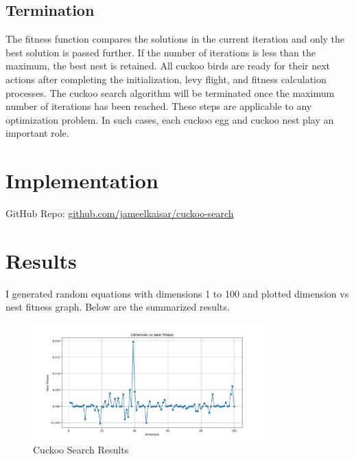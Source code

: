\documentclass{article}
\begin{document}
\subsection*{Termination}
The fitness function compares the solutions in the current iteration and only the best solution is passed further. If the number of iterations is less than the maximum, the best nest is retained. All cuckoo birds are ready for their next actions after completing the initialization, levy flight, and fitness calculation processes. The cuckoo search algorithm will be terminated once the maximum number of iterations has been reached. These steps are applicable to any optimization problem. In such cases, each cuckoo egg and cuckoo nest play an important role.

\section*{Implementation}

GitHub Repo: \href{https://github.com/jameelkaisar/cuckoo-search}{github.com/jameelkaisar/cuckoo-search}

\newpage

\section*{Results}
I generated random equations with dimensions 1 to 100 and plotted dimension vs nest fitness graph. Below are the summarized results.

\begin{figure}[H]
    \centering
    \includegraphics[width=0.8\textwidth]{files/results.png}
    \caption{Cuckoo Search Results}
    \label{fig:results}
\end{figure}
\end{document}
